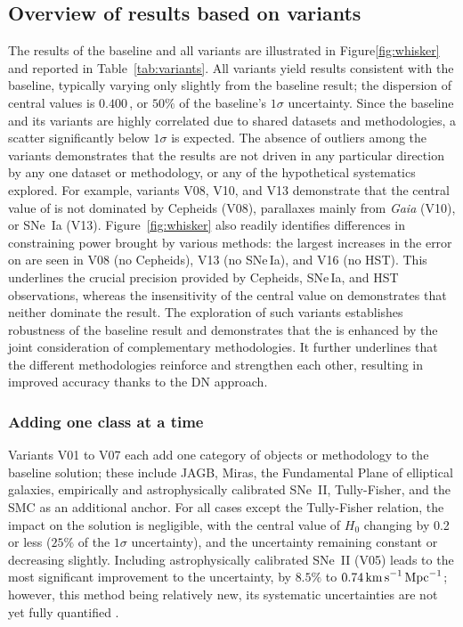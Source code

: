 \subsection{Overview of results based on variants} \label{sec:variant_results}

The results of the baseline and all variants are illustrated in Figure\ref{fig:whisker} and reported in Table~\ref{tab:variants}. All variants yield results consistent with the baseline, typically varying only slightly from the baseline result; the dispersion of central values is $0.400$\,\Hunit, or $50\%$ of the baseline's $1\sigma$ uncertainty. Since the baseline and its variants are highly correlated due to shared datasets and methodologies, a scatter significantly below $1\sigma$ is expected. The absence of outliers among the variants demonstrates that the results are not driven in any particular direction by any one dataset or methodology, or any of the hypothetical systematics explored. For example, variants V08, V10, and V13 demonstrate that the central value of {\Hcst} is not dominated by Cepheids (V08), parallaxes mainly from {\it Gaia} (V10), or SNe~Ia (V13).  
Figure~\ref{fig:whisker} also readily identifies differences in constraining power brought by various methods: the largest increases in the error on \Hcst{} are seen in V08 (no Cepheids), V13 (no SNe\,Ia), and V16 (no HST). This underlines the crucial precision provided by Cepheids, SNe\,Ia, and {HST} observations, whereas the insensitivity of the central value on \Hcst{} demonstrates that neither dominate the result.
The exploration of such variants establishes robustness of the baseline result and demonstrates that the {\DN} is enhanced by the joint consideration of complementary methodologies. It further underlines that the different methodologies reinforce and strengthen each other, resulting in improved accuracy thanks to the DN approach.  

\subsubsection {Adding one class at a time}

Variants V01 to V07 each add one category of objects or methodology to the baseline solution; these include JAGB, Miras, the Fundamental Plane of elliptical galaxies, empirically and astrophysically calibrated SNe~II, Tully-Fisher, and the SMC as an additional anchor.  For all cases except the Tully-Fisher relation, the impact on the solution is negligible, with the central value of $ H_0 $ changing by 0.2 {\Hunit} or less ($25\%$ of the $1\sigma$ uncertainty), and the uncertainty remaining constant or decreasing slightly.  Including astrophysically calibrated SNe~II (V05) leads to the most significant improvement to the uncertainty, by $8.5\%$ to $ 0.74 \,{\rm km\,s}^{-1}{\rm\,Mpc}^{-1} $; however, this method being relatively new, its systematic uncertainties are not yet fully quantified \citep{2025AA...702A..41V}.  

